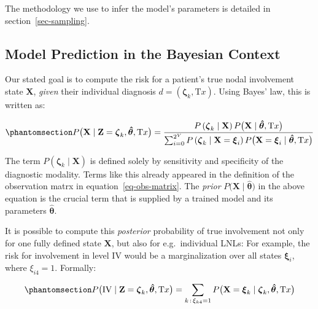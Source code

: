 \documentclass[
  sn-mathphys-num,
]{sn-jnl}
\begin{document}
The methodology we use to infer the model's parameters is detailed in
section~\ref{sec-sampling}.

\subsection{Model Prediction in the Bayesian
Context}\label{model-prediction-in-the-bayesian-context}

Our stated goal is to compute the risk for a patient's true nodal
involvement state \(\mathbf{X}\), \emph{given} their individual
diagnosis \(d = \left( \boldsymbol{\zeta}_k, \text{T}x \right)\). Using
Bayes' law, this is written as:

\begin{equation}\phantomsection\label{eq-uni-bayes-law}{
P \big( \mathbf{X} \mid \mathbf{Z}=\boldsymbol{\zeta}_k, \boldsymbol{\hat{\theta}}, \text{T}x \big) = \frac{P \left( \boldsymbol{\zeta}_k \mid \mathbf{X} \right) P \big( \mathbf{X} \mid \boldsymbol{\hat{\theta}}, \text{T}x \big)}{\sum_{i=0}^{2^V} P \left( \boldsymbol{\zeta}_k \mid \mathbf{X}=\boldsymbol{\xi}_i \right) P \big( \mathbf{X}=\boldsymbol{\xi}_i \mid \boldsymbol{\hat{\theta}}, \text{T}x \big)}
}\end{equation}

The term \(P \left( \boldsymbol{\zeta}_k \mid \mathbf{X} \right)\) is
defined solely by sensitivity and specificity of the diagnostic
modality. Terms like this already appeared in the definition of the
observation matrx in equation~\ref{eq-obs-matrix}. The \emph{prior}
\(P \big( \mathbf{X} \mid \boldsymbol{\hat{\theta}} \big)\) in the above
equation is the crucial term that is supplied by a trained model and its
parameters \(\boldsymbol{\hat{\theta}}\).

It is possible to compute this \emph{posterior} probability of true
involvement not only for one fully defined state \(\mathbf{X}\), but
also for e.g.~individual LNLs: For example, the risk for involvement in
level IV would be a marginalization over all states
\(\boldsymbol{\xi}_i\), where \(\xi_{i4}=1\). Formally:

\begin{equation}\phantomsection\label{eq-marg-over-posterior}{
P \big( \text{IV} \mid \mathbf{Z}=\boldsymbol{\zeta}_k, \boldsymbol{\hat{\theta}}, \text{T}x  \big) = \sum_{k \, : \, \xi_{k4}=1} P \big( \mathbf{X} = \boldsymbol{\xi}_k \mid \boldsymbol{\zeta}_k, \boldsymbol{\hat{\theta}}, \text{T}x  \big)
}\end{equation}
\end{document}
